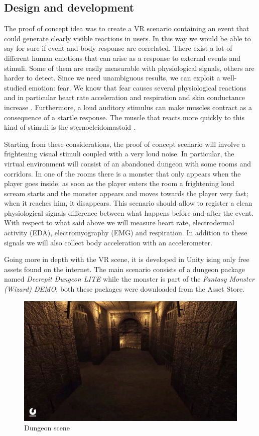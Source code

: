 \documentclass[binding=0.6cm,LaM]{sapthesis}
\begin{document}
\subsection{Design and development}
The proof of concept idea was to create a VR scenario containing an event that could generate clearly visible reactions in users. In this way we would be able to say for sure if event and body response are correlated. There exist a lot of different human emotions that can arise as a response to external events and stimuli. Some of them are easily measurable with physiological signals, others are harder to detect. Since we need unambiguous results, we can exploit a well-studied emotion: fear. We know that fear causes several physiological reactions and in particular heart rate acceleration and respiration and skin conductance increase  \cite{levenson1990voluntary}. Furthermore, a loud auditory stimulus can make muscles contract as a consequence of a startle response. The muscle that reacts more quickly to this kind of stimuli is the sternocleidomastoid \cite{brown1991new}.

Starting from these considerations, the proof of concept scenario will involve a frightening visual stimuli coupled with a very loud noise. In particular, the virtual environment will consist of an abandoned dungeon with some rooms and corridors. In one of the rooms there is a monster that only appears when the player goes inside: as soon as the player enters the room a frightening loud scream starts and the monster appears and moves towards the player very fast; when it reaches him, it disappears. This scenario should allow to register a clean physiological signals difference between what happens before and after the event. 
With respect to what said above we will measure heart rate, electrodermal activity (EDA), electromyography (EMG) and respiration. In addition to these signals we will also collect body acceleration with an accelerometer.

Going more in depth with the VR scene, it is developed in Unity ising only free assets found on the internet. The main scenario consists of a dungeon package named \textit{Decrepit Dungeon LITE} while the monster is part of the \textit{Fantasy Monster (Wizard) DEMO}; both these packages were downloaded from the Asset Store. 

\begin{figure}[h]
\centering
\includegraphics[scale=.28]{images/dungeon2}
\caption{Dungeon scene}
\end{figure}
\end{document}
